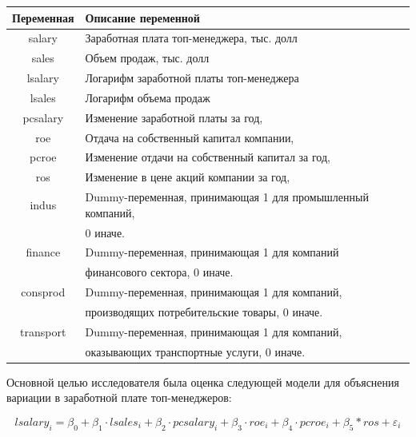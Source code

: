 \begin{tabular}{cl}
\toprule
Переменная &	Описание переменной \\
\midrule
salary & Заработная плата топ-менеджера, тыс. долл \\
sales & Объем продаж, тыс. долл \\
lsalary & Логарифм заработной платы топ-менеджера \\
lsales & Логарифм объема продаж \\
pcsalary & Изменение заработной платы за год,  \\
roe & Отдача на собственный капитал компании,   \\
pcroe & Изменение отдачи на собственный капитал за год,  \\
ros & Изменение в цене акций компании за год, \\
indus & Dummy-переменная, принимающая 1 для промышленный компаний, \\
& 0 иначе. \\
finance & Dummy-переменная, принимающая 1 для компаний \\
& финансового сектора, 0 иначе. \\
consprod & Dummy-переменная, принимающая 1 для компаний, \\
& производящих потребительские товары, 0 иначе. \\
transport & Dummy-переменная, принимающая 1 для компаний, \\
& оказывающих транспортные услуги, 0 иначе. \\
\bottomrule
\end{tabular}


Основной целью исследователя была оценка следующей модели для объяснения вариации в заработной плате топ-менеджеров:

\[
lsalary_i= \beta_0 + \beta_1 \cdot lsales_i + \beta_2 \cdot pcsalary_i + 
\beta_3 \cdot roe_i +\beta_4 \cdot pcroe_i + \beta_5*ros + \varepsilon_i
\]

